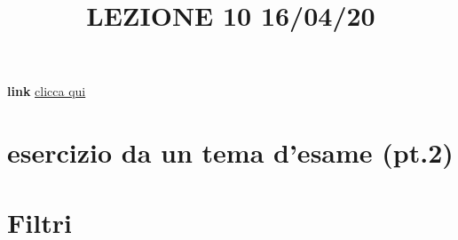 \title{LEZIONE 10 16/04/20}
\textbf{link} \href{https://web.microsoftstream.com/video/23680e25-5ca6-48fc-aeb4-4cdbbee98726?list=user&userId=cfe0965d-9a7c-40e2-be6e-f078296a1914}{clicca qui}
\section{esercizio da un tema d'esame (pt.2)}
\section{Filtri}